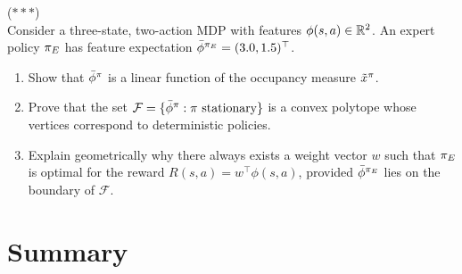 \documentclass[11pt,a4paper]{article}
\begin{document}
\begin{exercise}
\textnormal{(\(***\))} \\
Consider a three-state, two-action MDP with features
$\phi(s,a) \in \mathbb{R}^2$. An expert policy $\pi_E$ has feature
expectation $\bar{\phi}^{\pi_E} = (3.0, 1.5)^\top$.
\begin{enumerate}[label=(\alph*)]
    \item Show that $\bar{\phi}^\pi$ is a linear function of
    the occupancy measure $\tilde{x}^\pi$.
    \item Prove that the set
    $\mathcal{F} = \{\bar{\phi}^\pi : \pi \text{ stationary}\}$
    is a convex polytope whose vertices correspond to deterministic
    policies.
    \item Explain geometrically why there always exists a weight
    vector $w$ such that $\pi_E$ is optimal for the reward
    $R(s,a) = w^\top \phi(s,a)$, provided $\bar{\phi}^{\pi_E}$
    lies on the boundary of $\mathcal{F}$.
\end{enumerate}
\end{exercise}


\section{Summary}
\label{sec:summary}
\end{document}
